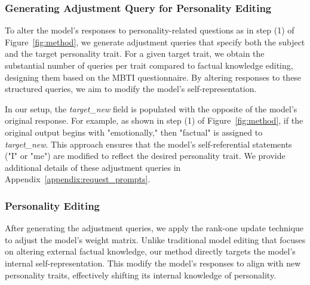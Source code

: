 \subsubsection{Generating Adjustment Query for Personality Editing}
To alter the model's responses to personality-related questions as in step (1) of Figure~\ref{fig:method}, we generate adjustment queries that specify both the subject and the target personality trait. For a given target trait, we obtain the substantial number of queries per trait compared to factual knowledge editing, designing them based on the MBTI questionnaire. By altering responses to these structured queries, we aim to modify the model's self-representation.


In our setup, the \textit{target\_new} field is populated with the opposite of the model’s original response. For example, as shown in step (1) of Figure~\ref{fig:method}, if the original output begins with "emotionally," then "factual" is assigned to \textit{target\_new}. This approach ensures that the model's self-referential statements ("I" or "me") are modified to reflect the desired personality trait. 
We provide additional details of these adjustment queries in Appendix~\ref{appendix:request_prompts}.

\subsubsection{Personality Editing}
After generating the adjustment queries, we apply the rank-one update technique to adjust the model’s weight matrix. Unlike traditional model editing that focuses on altering external factual knowledge, our method directly targets the model’s internal self-representation. This modify the model’s responses to align with new personality traits, effectively shifting its internal knowledge of personality. 
